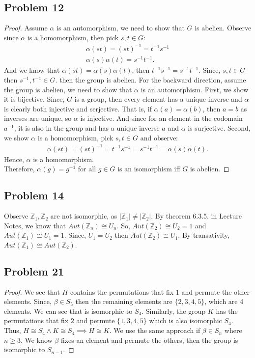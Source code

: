 \documentclass[a4paper,12pt]{article}
\begin{document}
\subsection*{Problem 12}
\begin{proof}
    Assume $\alpha$ is an automorphism, we need to show that $G$ is abelien. Observe since $\alpha$ is a homomorphism, then pick $s,t \in G$:
    \begin{align*}
        \alpha(st)=(st)^{-1}=t^{-1}s^{-1}\\
        \alpha(s)\alpha(t)=s^{-1}t^{-1}.
    \end{align*}
    And we know that $\alpha(st)=\alpha(s)\alpha(t)$, then $t^{-1}s^{-1}=s^{-1}t^{-1}.$ Since, $s,t \in G$ then $s^{-1},t^{-1} \in G.$ then the group is abelien.
    For the backward direction, assume the group is abelien, we need to show that $\alpha$ is an automorphism. First, we show it is bijective. 
    Since, $G$ is a group, then every element has a unique inverse and $\alpha$ is clearly both injective and serjective. That is, if $\alpha(a)=\alpha(b)$, then $a=b$ as inverses are unique, so $\alpha$ is injective. And since for an element in the codomain $a^{-1}$, it is also in the group and has a unique inverse $a$ and $\alpha$ is surjective. Second, we show $\alpha$ is a homomorphism, pick $s,t \in G$ and observe:
    \begin{align*}
        \alpha(st)=(st)^{-1}=t^{-1}s^{-1}=s^{-1}t^{-1}=\alpha(s)\alpha(t).
    \end{align*}
    Hence, $\alpha$ is a homomorphism.\\
    Therefore, $\alpha(g)=g^{-1}$ for all $g \in G$ is an isomorphism iff $G$ is abelien.
\end{proof}
\subsection*{Problem 14}
Observe $\mathbb{Z}_1, \mathbb{Z}_2$ are not isomorphic, as $|\mathbb{Z}_1| \ne |\mathbb{Z}_2|.$
By theorem 6.3.5. in Lecture Notes, we know that $Aut(\mathbb{Z}_n)\cong U_n.$ So, $Aut(\mathbb{Z}_2) \cong U_2 = {1}$ and $Aut(\mathbb{Z}_1) \cong U_1= {1}.$ Since, $U_1=U_2$ then $Aut(\mathbb{Z}_2) \cong U_1$. By transativity, $Aut(\mathbb{Z}_1) \cong Aut(\mathbb{Z}_2).$
\subsection*{Problem 21}
\begin{proof}We see that $H$ contains the permutations that fix $1$ and permute the other elements. Since, $\beta \in S_5$ then the remaining elements are $\{2,3,4,5\}$, which are 4 elements. We can see that is isomorphic to $S_4$. Similarly, the group $K$ has the permutations that fix $2$ and permute $\{1,3,4,5\}$ which is also isomorphic $S_4$. Thus, $H \cong S_4 \wedge K \cong S_4 \implies H \cong K.$
We use the same approach if $\beta \in S_n$ where $n\ge 3$. We know $\beta$ fixes an element and permute the others, then the group is isomorphic to $S_{n-1}.$
\end{proof}
\end{document}
